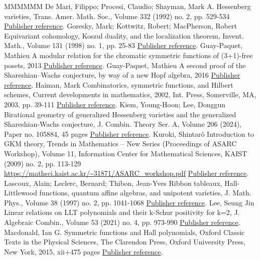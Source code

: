 \begin{thebibliography}{MMMMMM}
 De Mari, Filippo; Procesi, Claudio; Shayman, Mark A. Hessenberg varieties, Trans. Amer. Math. Soc., Volume 332 (1992) no. 2, pp. 529-534 \href{https://alco.centre-mersenne.org/articles/10.5802/alco.349/#DMPS}{Publisher reference}.
 Goresky, Mark; Kottwitz, Robert; MacPherson, Robert Equivariant cohomology, Koszul duality, and the localization theorem, Invent. Math., Volume 131 (1998) no. 1, pp. 25-83 \href{https://alco.centre-mersenne.org/articles/10.5802/alco.349/#GKM}{Publisher reference}.
 Guay-Paquet, Mathieu A modular relation for the chromatic symmetric functions of (3+1)-free posets, 2013 \href{https://alco.centre-mersenne.org/articles/10.5802/alco.349/#GP}{Publisher reference}.
 Guay-Paquet, Mathieu A second proof of the Shareshian–Wachs conjecture, by way of a new Hopf algebra, 2016 \href{https://alco.centre-mersenne.org/articles/10.5802/alco.349/#GP2}{Publisher reference}.
 Haiman, Mark Combinatorics, symmetric functions, and Hilbert schemes, Current developments in mathematics, 2002, Int. Press, Somerville, MA, 2003, pp. 39-111 \href{https://alco.centre-mersenne.org/articles/10.5802/alco.349/#Hai}{Publisher reference}.
 Kiem, Young-Hoon; Lee, Donggun Birational geometry of generalized Hessenberg varieties and the generalized Shareshian-Wachs conjecture, J. Combin. Theory Ser. A, Volume 206 (2024), Paper no. 105884, 45 pages \href{https://alco.centre-mersenne.org/articles/10.5802/alco.349/#KL}{Publisher reference}.
 Kuroki, Shintarô Introduction to GKM theory, Trends in Mathematics – New Series (Proceedings of ASARC Workshop), Volume 11, Information Center for Mathematical Sciences, KAIST (2009) no. 2, pp. 113-129 \url{https://mathsci.kaist.ac.kr/~31871/ASARC_workshop.pdf} \href{https://alco.centre-mersenne.org/articles/10.5802/alco.349/#Kur}{Publisher reference}.
 Lascoux, Alain; Leclerc, Bernard; Thibon, Jean-Yves Ribbon tableaux, Hall-Littlewood functions, quantum affine algebras, and unipotent varieties, J. Math. Phys., Volume 38 (1997) no. 2, pp. 1041-1068 \href{https://alco.centre-mersenne.org/articles/10.5802/alco.349/#LLT}{Publisher reference}.
 Lee, Seung Jin Linear relations on LLT polynomials and their k-Schur positivity for k=2, J. Algebraic Combin., Volume 53 (2021) no. 4, pp. 973-990 \href{https://alco.centre-mersenne.org/articles/10.5802/alco.349/#Lee}{Publisher reference}.
 Macdonald, Ian G. Symmetric functions and Hall polynomials, Oxford Classic Texts in the Physical Sciences, The Clarendon Press, Oxford University Press, New York, 2015, xii+475 pages \href{https://alco.centre-mersenne.org/articles/10.5802/alco.349/#Mac}{Publisher reference}.

\end{thebibliography}
